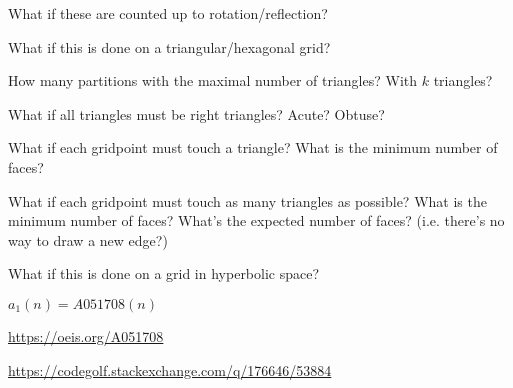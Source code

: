 \documentclass{article}
\begin{document}
\begin{related}
  \item What if these are counted up to rotation/reflection?
  \item What if this is done on a triangular/hexagonal grid?
  \item How many partitions with the maximal number of triangles? With $k$ triangles?
  \item What if all triangles must be right triangles? Acute? Obtuse?
  \item What if each gridpoint must touch a triangle?
  What is the minimum number of faces?
  \item What if each gridpoint must touch as many triangles as possible?
  What is the minimum number of faces? What's the expected number of faces?
  (i.e. there's no way to draw a new edge?)
  \item What if this is done on a grid in hyperbolic space?
\end{related}

\begin{note}
  $a_1(n) = A051708(n)$
\end{note}

\begin{references}
  \item \url{https://oeis.org/A051708}
  \item \url{https://codegolf.stackexchange.com/q/176646/53884}
\end{references}
\end{document}
